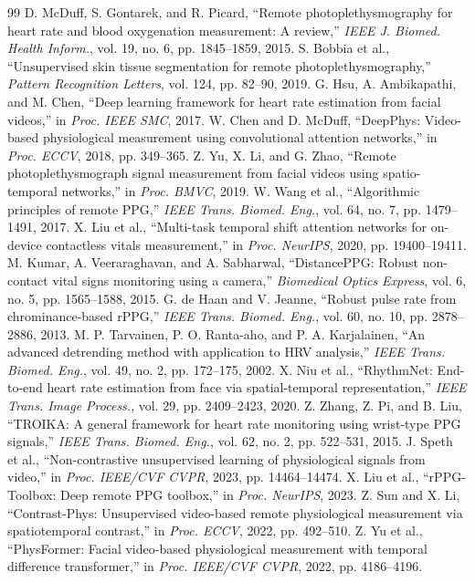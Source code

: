 \documentclass[conference]{IEEEtran}
\begin{document}
\begin{thebibliography}{99}
 D. McDuff, S. Gontarek, and R. Picard, ``Remote photoplethysmography for heart rate and blood oxygenation measurement: A review,'' \textit{IEEE J. Biomed. Health Inform.}, vol. 19, no. 6, pp. 1845--1859, 2015.
 S. Bobbia et al., ``Unsupervised skin tissue segmentation for remote photoplethysmography,'' \textit{Pattern Recognition Letters}, vol. 124, pp. 82--90, 2019.
 G. Hsu, A. Ambikapathi, and M. Chen, ``Deep learning framework for heart rate estimation from facial videos,'' in \textit{Proc. IEEE SMC}, 2017.
 W. Chen and D. McDuff, ``DeepPhys: Video-based physiological measurement using convolutional attention networks,'' in \textit{Proc. ECCV}, 2018, pp. 349--365.
 Z. Yu, X. Li, and G. Zhao, ``Remote photoplethysmograph signal measurement from facial videos using spatio-temporal networks,'' in \textit{Proc. BMVC}, 2019.
 W. Wang et al., ``Algorithmic principles of remote PPG,'' \textit{IEEE Trans. Biomed. Eng.}, vol. 64, no. 7, pp. 1479--1491, 2017.
 X. Liu et al., ``Multi-task temporal shift attention networks for on-device contactless vitals measurement,'' in \textit{Proc. NeurIPS}, 2020, pp. 19400--19411.
 M. Kumar, A. Veeraraghavan, and A. Sabharwal, ``DistancePPG: Robust non-contact vital signs monitoring using a camera,'' \textit{Biomedical Optics Express}, vol. 6, no. 5, pp. 1565--1588, 2015.
 G. de Haan and V. Jeanne, ``Robust pulse rate from chrominance-based rPPG,'' \textit{IEEE Trans. Biomed. Eng.}, vol. 60, no. 10, pp. 2878--2886, 2013.
 M. P. Tarvainen, P. O. Ranta-aho, and P. A. Karjalainen, ``An advanced detrending method with application to HRV analysis,'' \textit{IEEE Trans. Biomed. Eng.}, vol. 49, no. 2, pp. 172--175, 2002.
 X. Niu et al., ``RhythmNet: End-to-end heart rate estimation from face via spatial-temporal representation,'' \textit{IEEE Trans. Image Process.}, vol. 29, pp. 2409--2423, 2020.
 Z. Zhang, Z. Pi, and B. Liu, ``TROIKA: A general framework for heart rate monitoring using wrist-type PPG signals,'' \textit{IEEE Trans. Biomed. Eng.}, vol. 62, no. 2, pp. 522--531, 2015.
 J. Speth et al., ``Non-contrastive unsupervised learning of physiological signals from video,'' in \textit{Proc. IEEE/CVF CVPR}, 2023, pp. 14464--14474.
 X. Liu et al., ``rPPG-Toolbox: Deep remote PPG toolbox,'' in \textit{Proc. NeurIPS}, 2023.
 Z. Sun and X. Li, ``Contrast-Phys: Unsupervised video-based remote physiological measurement via spatiotemporal contrast,'' in \textit{Proc. ECCV}, 2022, pp. 492--510.
 Z. Yu et al., ``PhysFormer: Facial video-based physiological measurement with temporal difference transformer,'' in \textit{Proc. IEEE/CVF CVPR}, 2022, pp. 4186--4196.
\end{thebibliography}
\end{document}
